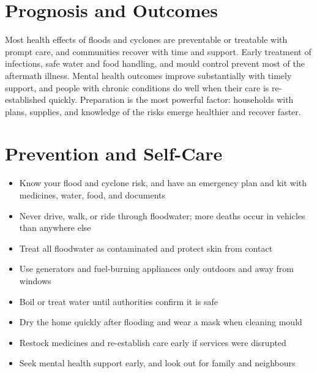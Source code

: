 \section*{Prognosis and Outcomes}
Most health effects of floods and cyclones are preventable or treatable with prompt care, and communities recover with time and support. Early treatment of infections, safe water and food handling, and mould control prevent most of the aftermath illness. Mental health outcomes improve substantially with timely support, and people with chronic conditions do well when their care is re-established quickly. Preparation is the most powerful factor: households with plans, supplies, and knowledge of the risks emerge healthier and recover faster.

\section*{Prevention and Self-Care}
\begin{itemize}
    \item Know your flood and cyclone risk, and have an emergency plan and kit with medicines, water, food, and documents
    \item Never drive, walk, or ride through floodwater; more deaths occur in vehicles than anywhere else
    \item Treat all floodwater as contaminated and protect skin from contact
    \item Use generators and fuel-burning appliances only outdoors and away from windows
    \item Boil or treat water until authorities confirm it is safe
    \item Dry the home quickly after flooding and wear a mask when cleaning mould
    \item Restock medicines and re-establish care early if services were disrupted
    \item Seek mental health support early, and look out for family and neighbours
\end{itemize}

